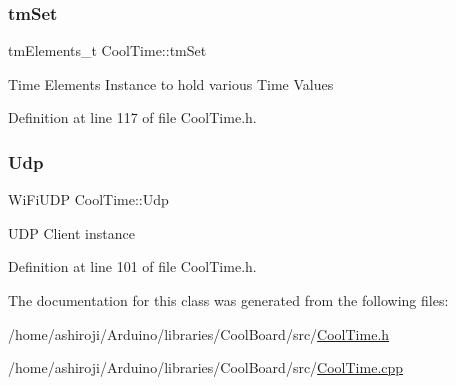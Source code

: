 \subsubsection{\texorpdfstring{tm\+Set}{tmSet}}
{\footnotesize\ttfamily tm\+Elements\+\_\+t Cool\+Time\+::tm\+Set\hspace{0.3cm}{\ttfamily [private]}}

Time Elements Instance to hold various Time Values 

Definition at line 117 of file Cool\+Time.\+h.

\mbox{\label{class_cool_time_a4e23216a8121ca79d0fb019f30884b92}} 
\subsubsection{\texorpdfstring{Udp}{Udp}}
{\footnotesize\ttfamily Wi\+Fi\+U\+DP Cool\+Time\+::\+Udp\hspace{0.3cm}{\ttfamily [private]}}

U\+DP Client instance 

Definition at line 101 of file Cool\+Time.\+h.



The documentation for this class was generated from the following files\+:\begin{DoxyCompactItemize}
\item 
/home/ashiroji/\+Arduino/libraries/\+Cool\+Board/src/\hyperlink{_cool_time_8h}{Cool\+Time.\+h}\item 
/home/ashiroji/\+Arduino/libraries/\+Cool\+Board/src/\hyperlink{_cool_time_8cpp}{Cool\+Time.\+cpp}\end{DoxyCompactItemize}
